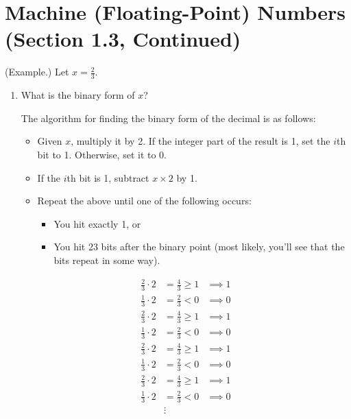 \documentclass[letterpaper]{article}
\begin{document}
\section{Machine (Floating-Point) Numbers (Section 1.3, Continued)}
\begin{mdframed}
    (Example.) Let $x = \frac{2}{3}$. 
    
    \begin{enumerate}[(1)]
        \item What is the binary form of $x$?
        \begin{mdframed}
            The algorithm for finding the binary form of the decimal is as follows: 
            \begin{itemize}
                \item Given $x$, multiply it by 2. If the integer part of the result is 1, set the $i$th bit to 1. Otherwise, set it to 0. 
                \item If the $i$th bit is 1, subtract $x \times 2$ by 1. 
                \item Repeat the above until one of the following occurs: 
                \begin{itemize}
                    \item You hit exactly 1, or 
                    \item You hit 23 bits after the binary point (most likely, you'll see that the bits repeat in some way). 
                \end{itemize}
            \end{itemize}
            \[\begin{aligned}
                \frac{2}{3} \cdot 2 &= \frac{4}{3} \geq 1 &\implies 1 \\ 
                \frac{1}{3} \cdot 2 &= \frac{2}{3} < 0 &\implies 0 \\
                \frac{2}{3} \cdot 2 &= \frac{4}{3} \geq 1 &\implies 1 \\ 
                \frac{1}{3} \cdot 2 &= \frac{2}{3} < 0 &\implies 0 \\
                \frac{2}{3} \cdot 2 &= \frac{4}{3} \geq 1 &\implies 1 \\ 
                \frac{1}{3} \cdot 2 &= \frac{2}{3} < 0 &\implies 0 \\
                \frac{2}{3} \cdot 2 &= \frac{4}{3} \geq 1 &\implies 1 \\ 
                \frac{1}{3} \cdot 2 &= \frac{2}{3} < 0 &\implies 0 \\
                &\vdots

\end{aligned}\]
\end{mdframed}
\end{enumerate}
\end{mdframed}
\end{document}
